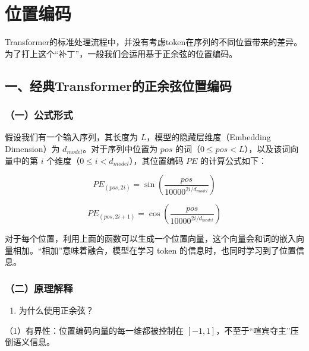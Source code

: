 \clearpage

\hypertarget{ux4f4dux7f6eux7f16ux7801}{%
\section{位置编码}\label{ux4f4dux7f6eux7f16ux7801}}

Transformer的标准处理流程中，并没有考虑token在序列的不同位置带来的差异。为了打上这个``补丁''，一般我们会运用基于正余弦的位置编码。

\hypertarget{ux4e00ux7ecfux5178transformerux7684ux6b63ux4f59ux5f26ux4f4dux7f6eux7f16ux7801}{%
\subsection{一、经典Transformer的正余弦位置编码}\label{ux4e00ux7ecfux5178transformerux7684ux6b63ux4f59ux5f26ux4f4dux7f6eux7f16ux7801}}

\hypertarget{ux4e00ux516cux5f0fux5f62ux5f0f}{%
\subsubsection{（一）公式形式}\label{ux4e00ux516cux5f0fux5f62ux5f0f}}

假设我们有一个输入序列，其长度为 \(L\)，模型的隐藏层维度（Embedding Dimension）为 \(d_{model}\)。对于序列中位置为 \(pos\) 的词（\(0 \le pos < L\)），以及该词向量中的第 \(i\) 个维度（\(0 \le i < d_{model}\)），其位置编码 \(PE\) 的计算公式如下：

\[
PE_{(pos,2i)}=\sin\left(\frac{pos}{10000^{2i/d_{model}}}\right)
\]

\[
PE_{(pos,2i+1)}=\cos\left(\frac{pos}{10000^{2i/d_{model}}}\right)
\]

对于每个位置，利用上面的函数可以生成一个位置向量，这个向量会和词的嵌入向量相加。``相加''意味着融合，模型在学习 token 的信息时，也同时学习到了位置信息。

\hypertarget{ux4e8cux539fux7406ux89e3ux91ca}{%
\subsubsection{（二）原理解释}\label{ux4e8cux539fux7406ux89e3ux91ca}}

\begin{enumerate}
\def\labelenumi{\arabic{enumi}.}
\tightlist
\item
  为什么使用正余弦？
\end{enumerate}

（1）有界性：位置编码向量的每一维都被控制在 \([-1,1]\)，不至于``喧宾夺主''压倒语义信息。

